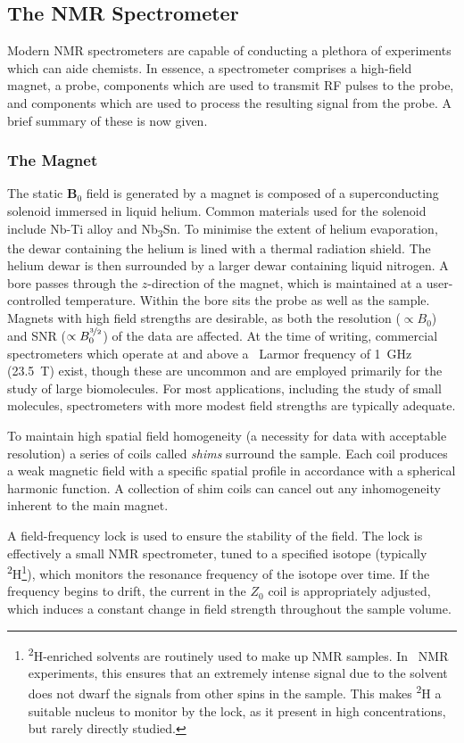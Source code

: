 \subsection{The NMR Spectrometer}

Modern \ac{NMR} spectrometers are capable of conducting a plethora of
experiments which can aide chemists.
In essence, a spectrometer comprises a high-field magnet, a probe, components
which are used to transmit \ac{RF} pulses to the probe, and components which
are used to process the resulting signal from the probe. A brief summary of
these is now given.

\subsubsection{The Magnet}
The static $\symbf{B}_0$ field is generated by a magnet is composed of a
superconducting solenoid immersed in liquid helium. Common materials used for
the solenoid include Nb-Ti alloy and Nb\textsubscript{3}Sn. To minimise the
extent of helium evaporation, the dewar containing the helium is lined with
a thermal radiation shield. The helium dewar is then surrounded by a larger
dewar containing liquid nitrogen. A bore passes through the $z$-direction of
the magnet, which is maintained at a user-controlled temperature. Within the
bore sits the probe as well as the sample. Magnets with high field
strengths are desirable, as both the resolution ($\propto B_0$) and \ac{SNR}
($\propto B_0^{\nicefrac{3}{2}}$) of the data are affected. At the
time of writing, commercial spectrometers which operate at and above a
\proton\ Larmor frequency of \qty{1}{\giga\hertz} (\qty{23.5}{\tesla}) exist,
though these are uncommon and are employed primarily for the study of large
biomolecules. For most applications, including the study of small molecules,
spectrometers with more modest field strengths are typically adequate.

To maintain high spatial field homogeneity (a necessity for data with
acceptable resolution) a series of coils called \textit{shims} surround the
sample. Each coil produces a weak magnetic field with a specific spatial
profile in accordance with a spherical harmonic function. A collection of shim
coils can cancel out any inhomogeneity inherent to the main magnet.

A field-frequency lock is used to ensure the stability of the
field. The lock is effectively a small \ac{NMR} spectrometer, tuned to a
specified isotope (typically \textsuperscript{2}H\footnote{
    \textsuperscript{2}H-enriched solvents are routinely used to make up
    \ac{NMR} samples. In \proton\ \ac{NMR} experiments, this ensures that an
    extremely intense signal due to the solvent does not dwarf the signals from
    other spins in the sample. This makes \textsuperscript{2}H a suitable
    nucleus to monitor by the lock, as it present in high concentrations, but
    rarely directly studied.
}), which monitors the resonance frequency of the isotope over
time. If the frequency begins to drift, the current in the $Z_0$ coil is
appropriately adjusted, which induces a constant change in field strength
throughout the sample volume.

